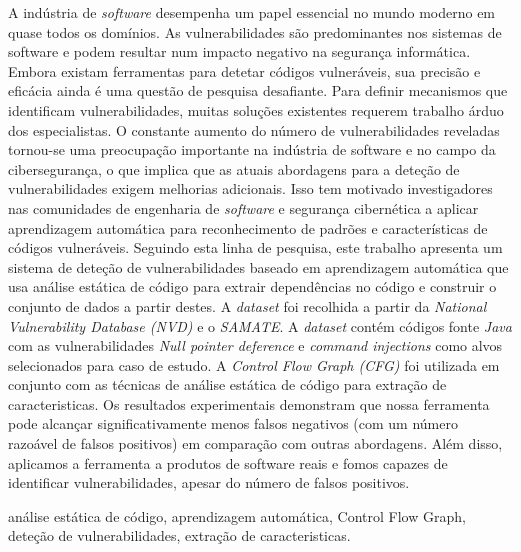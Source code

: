 \abstractPT  %

A indústria de \textit{software} desempenha um papel essencial no mundo moderno em quase todos os domínios. As vulnerabilidades são predominantes nos sistemas de software e podem resultar num impacto negativo na segurança informática. Embora existam ferramentas para detetar códigos vulneráveis, sua precisão e eficácia ainda é uma questão de pesquisa desafiante. Para definir mecanismos que identificam vulnerabilidades, muitas soluções existentes requerem trabalho árduo dos especialistas. O constante aumento do número de vulnerabilidades reveladas tornou-se uma preocupação importante na indústria de software e no campo da cibersegurança, o que implica que as atuais abordagens para a deteção de vulnerabilidades exigem melhorias adicionais. Isso tem motivado investigadores nas comunidades de engenharia de \textit{software} e segurança cibernética a aplicar aprendizagem automática para reconhecimento de padrões e características de códigos vulneráveis. Seguindo esta linha de pesquisa, este trabalho apresenta um sistema de deteção de vulnerabilidades baseado em  aprendizagem automática que usa análise estática de código para extrair dependências no código e construir o conjunto de dados a partir destes. A \textit{dataset} foi recolhida a partir da \textit{National Vulnerability Database (NVD)} e o \textit{SAMATE}. A \textit{dataset} contém códigos fonte \textit{Java} com as vulnerabilidades \textit{Null pointer deference} e \textit{command injections} como alvos selecionados para caso de estudo. A \textit{Control Flow Graph (CFG)} foi utilizada em conjunto com as técnicas de análise estática de código para extração de caracteristicas. Os resultados experimentais demonstram que nossa ferramenta pode alcançar significativamente menos falsos negativos (com um número razoável de falsos positivos) em comparação com outras abordagens. Além disso, aplicamos a ferramenta a produtos de software reais e fomos capazes de identificar vulnerabilidades, apesar do número de falsos positivos.

\begin{keywords}
análise estática de código, aprendizagem automática, Control Flow Graph, deteção de vulnerabilidades, extração de caracteristicas.
\end{keywords}
